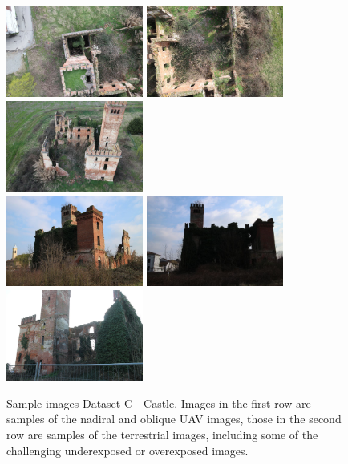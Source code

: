 \begin{figure}
  \centering
    \includegraphics[height=3cm]{castle_img_1}
    \includegraphics[height=3cm]{castle_img_2}
    \includegraphics[height=3cm]{castle_img_3} \\
    \includegraphics[height=3cm]{castle_img_4}
    \includegraphics[height=3cm]{castle_img_5}
    \includegraphics[height=3cm]{castle_img_6}
  \caption{Sample images Dataset C - Castle. Images in the first row are samples of the nadiral and oblique UAV images, those in the second row are samples of the terrestrial images, including some of the challenging underexposed or overexposed images.}
  \label{fig:5:castle_img}
\end{figure}

